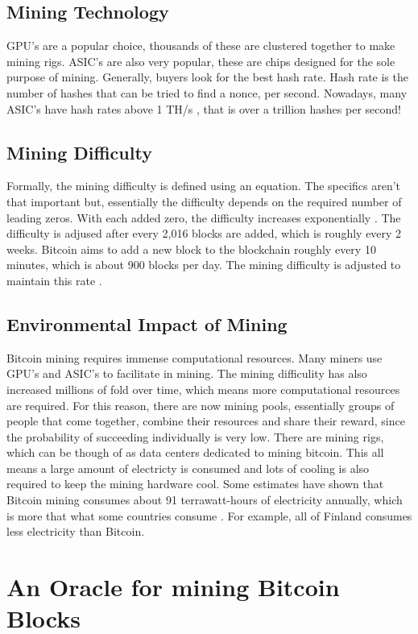 \documentclass[11pt]{article} %
\begin{document}
\subsection{Mining Technology}
GPU's are a popular choice, thousands of these are clustered together to make mining rigs. ASIC's are also very popular, these are chips designed for the sole purpose of mining. Generally, buyers look for the best hash rate. Hash rate is the number of hashes that can be tried to find a nonce, per second. Nowadays, many ASIC's have hash rates above 1 TH/s \cite{8}, that is over a trillion hashes per second!
\subsection{Mining Difficulty}
Formally, the mining difficulty is defined using an equation. The specifics aren't that important but, essentially the difficulty depends on the required number of leading zeros. With each added zero, the difficulty increases exponentially \cite{1}.  The difficulty is adjused after every 2,016 blocks are added, which is roughly every 2 weeks. Bitcoin aims to add a new block to the blockchain roughly every 10 minutes, which is about 900 blocks per day. The mining difficulty is adjusted to maintain this rate \cite{12}.

\subsection{Environmental Impact of Mining}{}
Bitcoin mining requires immense computational resources. Many miners use GPU's and ASIC's to facilitate in mining. The mining difficulity has also increased millions of fold over time, which means more computational resources are required. For this reason, there are now mining pools, essentially groups of people that come together, combine their resources and share their reward, since the probability of succeeding individually is very low. There are mining rigs, which can be though of as data centers dedicated to mining bitcoin. This all means a large amount of electricty is consumed and lots of cooling is also required to keep the mining hardware cool. Some estimates have shown that Bitcoin mining consumes about 91 terrawatt-hours of electricity annually, which is more that what some countries consume \cite{10}. For example, all of Finland consumes less electricity than Bitcoin.

\section{An Oracle for mining Bitcoin Blocks}{}
\end{document}
